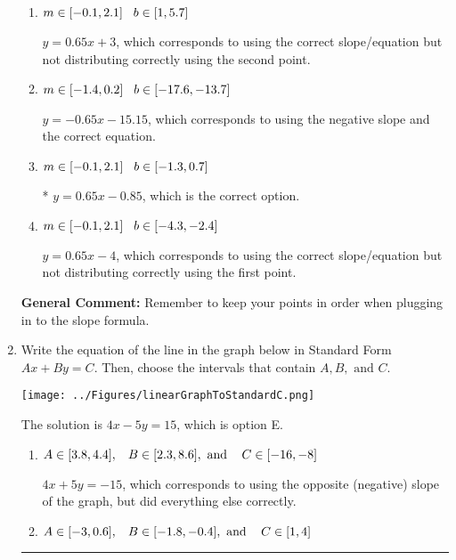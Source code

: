 \documentclass{extbook}[14pt]
\newcommand{\litem}[1]{\item #1

\rule{\textwidth}{0.4pt}}
\begin{document}
\begin{enumerate}
{\begin{enumerate}[label=\Alph*.]
 $y = 0.65x + 0.85$, which corresponds to using the correct slope and getting the negative y-intercept.
\item \( m \in [-0.1, 2.1] \hspace*{3mm} b \in [1, 5.7] \)

 $y = 0.65x + 3$, which corresponds to using the correct slope/equation but not distributing correctly using the second point.
\item \( m \in [-1.4, 0.2] \hspace*{3mm} b \in [-17.6, -13.7] \)

 $y = -0.65x -15.15$, which corresponds to using the negative slope and the correct equation.
\item \( m \in [-0.1, 2.1] \hspace*{3mm} b \in [-1.3, 0.7] \)

* $y = 0.65x -0.85$, which is the correct option.
\item \( m \in [-0.1, 2.1] \hspace*{3mm} b \in [-4.3, -2.4] \)

 $y = 0.65x -4$, which corresponds to using the correct slope/equation but not distributing correctly using the first point.
\end{enumerate}

\textbf{General Comment:} Remember to keep your points in order when plugging in to the slope formula.
}
\litem{
Write the equation of the line in the graph below in Standard Form $Ax+By=C$. Then, choose the intervals that contain $A, B, \text{ and } C$.

\begin{center}
    \texttt{[image: ../Figures/linearGraphToStandardC.png]}
\end{center}


The solution is \( 4x - 5y = 15 \), which is option E.\begin{enumerate}[label=\Alph*.]
\item \( A \in [3.8, 4.4], \hspace{3mm} B \in [2.3, 8.6], \text{ and } \hspace{3mm} C \in [-16, -8] \)

 $4x + 5y = -15$, which corresponds to using the opposite (negative) slope of the graph, but did everything else correctly.
\item \( A \in [-3, 0.6], \hspace{3mm} B \in [-1.8, -0.4], \text{ and } \hspace{3mm} C \in [1, 4] \)


\end{enumerate}}
\end{enumerate}
\end{document}

